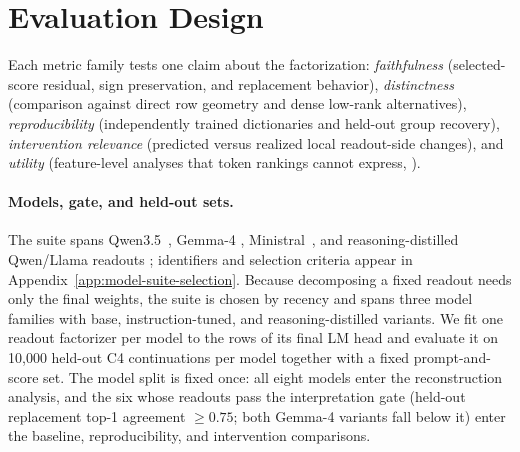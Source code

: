 \section{Evaluation Design}
\label{sec:experimental-setup}

Each metric family tests one claim about the factorization:
\emph{faithfulness} (selected-score residual, sign preservation, and
replacement behavior), \emph{distinctness} (comparison against direct
row geometry and dense low-rank alternatives),
\emph{reproducibility} (independently trained dictionaries and held-out
group recovery), \emph{intervention relevance} (predicted versus
realized local readout-side changes), and \emph{utility} (feature-level
analyses that token rankings cannot express,
).

\paragraph{Models, gate, and held-out sets.}
The suite spans Qwen3.5~\citep{qwen35collection}, Gemma-4
\citep{gemma4official,gemma4collection}, Ministral~\citep{liu2026ministral3},
and reasoning-distilled Qwen/Llama readouts \citep{deepseekai2025deepseekr1};
identifiers and selection criteria appear in
Appendix~\ref{app:model-suite-selection}. Because decomposing a fixed readout
needs only the final weights, the suite is chosen by recency and spans three
model families with base, instruction-tuned, and reasoning-distilled variants.
We fit one readout factorizer per model to the rows of its final LM head and
evaluate it on 10{,}000 held-out C4 continuations per model
\citep{raffel2020exploring,dodge2021documenting} together with a fixed
prompt-and-score set. The model split is fixed once: all eight models enter
the reconstruction analysis, and the six whose readouts pass the
interpretation gate (held-out replacement top-1 agreement \(\ge 0.75\);
both Gemma-4 variants fall below it) enter the baseline, reproducibility,
and intervention comparisons.

